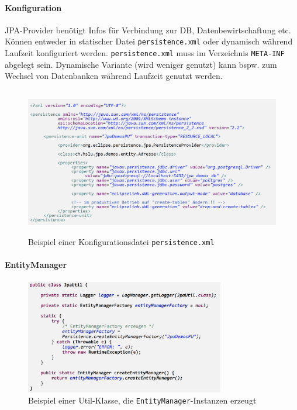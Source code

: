 \documentclass[a4paper]{article}
\begin{document}
			\paragraph{Konfiguration}
			
			JPA-Provider benötigt Infos für Verbindung zur DB, Datenbewirtschaftung etc.
			Können entweder in statischer Datei \texttt{persistence.xml} oder dynamisch während Laufzeit konfiguriert werden. 
			\texttt{persistence.xml} muss im Verzeichnis \texttt{META-INF} abgelegt sein.
			Dynamische Variante (wird weniger genutzt) kann bspw. zum Wechsel von Datenbanken während Laufzeit genutzt werden.
			
			\newpage
		
			\begin{figure}[!htb]
				\centering
				\includegraphics[keepaspectratio, height=6.5cm]{img/persistence/persistencexml.png}
				\caption{Beispiel einer Konfigurationsdatei \texttt{persistence.xml}}
				\label{fig:persistence_xml}
			\end{figure}
			
			\paragraph{EntityManager}
			
			\begin{figure}[!htb]
				\centering
				\includegraphics[keepaspectratio, height=5cm]{img/persistence/entityutil.png}
				\caption{Beispiel einer Util-Klasse, die \texttt{EntityManager}-Instanzen erzeugt}
				\label{fig:entity_util}
			\end{figure}
		
\end{document}

